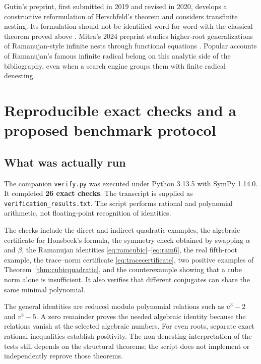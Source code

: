 \documentclass[11pt,letterpaper]{article}
\numberwithin{equation}{section}
\theoremstyle{definition}
\theoremstyle{remark}
\begin{document}
Gutin's preprint, first submitted in 2019 and revised in 2020, develops a constructive reformulation of Herschfeld's theorem and considers transfinite nesting. Its formulation should not be identified word-for-word with the classical theorem proved above \cite{gutin}. Mitra's 2024 preprint studies higher-root generalizations of Ramanujan-style infinite nests through functional equations \cite{mitra}. Popular accounts of Ramanujan's famous infinite radical belong on this analytic side of the bibliography, even when a search engine groups them with finite radical denesting.

\section{Reproducible exact checks and a proposed benchmark protocol}\label{sec:verification}

\subsection{What was actually run}
The companion \texttt{verify.py} was executed under Python 3.13.5 with SymPy 1.14.0. It completed \textbf{26 exact checks}. The transcript is supplied as \texttt{verification\_results.txt}. The script performs rational and polynomial arithmetic, not floating-point recognition of identities.

The checks include the direct and indirect quadratic examples, the algebraic certificate for Honsbeek's formula, the symmetry check obtained by swapping $\alpha$ and $\beta$, the Ramanujan identities \eqref{eq:ramcubic}--\eqref{eq:ram6}, the real fifth-root example, the trace--norm certificate \eqref{eq:tracecertificate}, two positive examples of Theorem~\ref{thm:cubicquadratic}, and the counterexample showing that a cube norm alone is insufficient. It also verifies that different conjugates can share the same minimal polynomial.

The general identities are reduced modulo polynomial relations such as $u^3-2$ and $v^3-5$. A zero remainder proves the needed algebraic identity because the relations vanish at the selected algebraic numbers. For even roots, separate exact rational inequalities establish positivity. The non-denesting interpretation of the tests still depends on the structural theorems; the script does not implement or independently reprove those theorems.
\end{document}
